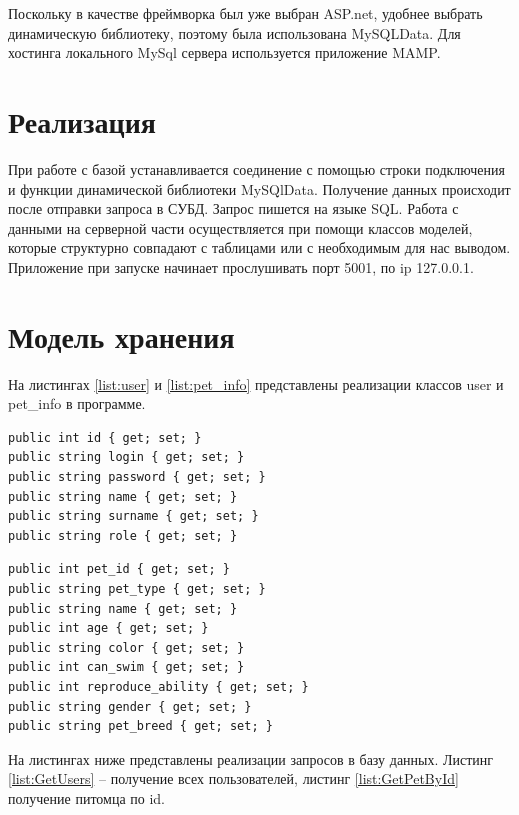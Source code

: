 \hspace{0cm} Поскольку в качестве фреймворка был уже выбран ASP.net, удобнее выбрать динамическую библиотеку, поэтому была использована MySQLData. Для хостинга локального MySql сервера используется приложение MAMP.

\section{Реализация}

\hspace{0cm} При работе с базой устанавливается соединение с помощью строки подключения и функции динамической библиотеки MySQlData. Получение данных происходит после отправки запроса в СУБД. Запрос пишется на языке SQL. Работа с данными на серверной части осуществляется при помощи классов моделей, которые структурно совпадают с таблицами или с необходимым для нас выводом. Приложение при запуске начинает прослушивать порт 5001, по ip 127.0.0.1.

\section{Модель хранения}

На листингах \ref{list:user} и \ref{list:pet_info} представлены реализации классов user и pet\_info в программе.

\begin{lstlisting}[caption=класс User, label=list:user]
public int id { get; set; }
public string login { get; set; }
public string password { get; set; }
public string name { get; set; }
public string surname { get; set; }
public string role { get; set; }
\end{lstlisting}

\begin{lstlisting}[caption=класс pet\_info, label=list:pet_info]
public int pet_id { get; set; }
public string pet_type { get; set; }
public string name { get; set; } 
public int age { get; set; } 
public string color { get; set; } 
public int can_swim { get; set; } 
public int reproduce_ability { get; set; } 
public string gender { get; set; } 
public string pet_breed { get; set; } 
\end{lstlisting}

На листингах ниже представлены реализации запросов в базу данных.
Листинг \ref{list:GetUsers} – получение всех пользователей, листинг \ref{list:GetPetById} получение питомца по id.

